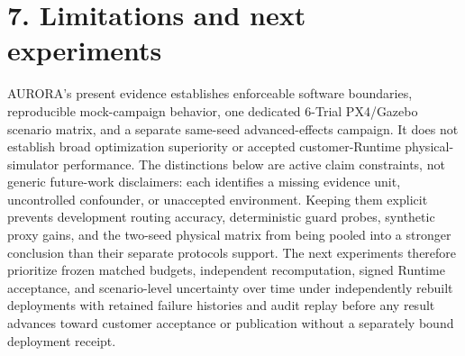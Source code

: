 \section{\texorpdfstring{\textbf{7. Limitations and next
experiments}}{7. Limitations and next experiments}}\label{limitations-and-next-experiments}

AURORA's present evidence establishes enforceable software boundaries,
reproducible mock-campaign behavior, one dedicated 6-Trial PX4/Gazebo
scenario matrix, and a separate same-seed advanced-effects campaign. It
does not establish broad optimization
superiority or accepted customer-Runtime physical-simulator performance.
The distinctions below are active claim constraints, not generic
future-work disclaimers: each identifies a missing evidence unit,
uncontrolled confounder, or unaccepted environment. Keeping them explicit
prevents development routing accuracy, deterministic guard probes,
synthetic proxy gains, and the two-seed physical matrix from being pooled
into a stronger conclusion than their separate protocols support. The
next experiments therefore prioritize frozen matched budgets,
independent recomputation, signed Runtime acceptance, and scenario-level
uncertainty over time under independently rebuilt deployments with
retained failure histories and audit replay before any result advances
toward customer acceptance or publication without a separately bound
deployment receipt.

